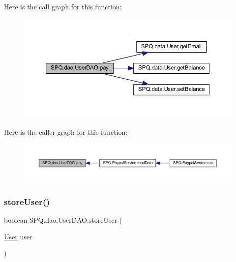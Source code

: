 Here is the call graph for this function\+:
\nopagebreak
\begin{figure}[H]
\begin{center}
\leavevmode
\includegraphics[width=350pt]{class_s_p_q_1_1dao_1_1_user_d_a_o_a8223c677b1ae55147860ea533be434a7_cgraph}
\end{center}
\end{figure}
Here is the caller graph for this function\+:
\nopagebreak
\begin{figure}[H]
\begin{center}
\leavevmode
\includegraphics[width=350pt]{class_s_p_q_1_1dao_1_1_user_d_a_o_a8223c677b1ae55147860ea533be434a7_icgraph}
\end{center}
\end{figure}
\mbox{\label{class_s_p_q_1_1dao_1_1_user_d_a_o_ad86d4148c7f3fd960fb32de7c68f3f6a}} 
\subsubsection{\texorpdfstring{store\+User()}{storeUser()}\hspace{0.1cm}{\footnotesize\ttfamily [1/2]}}
{\footnotesize\ttfamily boolean S\+P\+Q.\+dao.\+User\+D\+A\+O.\+store\+User (\begin{DoxyParamCaption}\item[{\mbox{\hyperlink{class_s_p_q_1_1data_1_1_user}{User}}}]{user }\end{DoxyParamCaption})}



